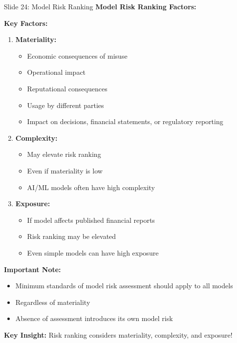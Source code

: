 \documentclass[8pt]{beamer}
\begin{document}
	\begin{frame}{Slide 24: Model Risk Ranking}
		\fontsize{6.5}{7.5}\selectfont
		\textbf{Model Risk Ranking Factors:}
		
		\vspace{0.1cm}
		\textbf{Key Factors:}
		\begin{enumerate}
			\item \textbf{Materiality:}
			\begin{itemize}
				\item Economic consequences of misuse
				\item Operational impact
				\item Reputational consequences
				\item Usage by different parties
				\item Impact on decisions, financial statements, or regulatory reporting
			\end{itemize}
			\item \textbf{Complexity:}
			\begin{itemize}
				\item May elevate risk ranking
				\item Even if materiality is low
				\item AI/ML models often have high complexity
			\end{itemize}
			\item \textbf{Exposure:}
			\begin{itemize}
				\item If model affects published financial reports
				\item Risk ranking may be elevated
				\item Even simple models can have high exposure
			\end{itemize}
		\end{enumerate}
		
		\vspace{0.1cm}
		\textbf{Important Note:}
		\begin{itemize}
			\item Minimum standards of model risk assessment should apply to all models
			\item Regardless of materiality
			\item Absence of assessment introduces its own model risk
		\end{itemize}
		
		\textcolor{myblue}{\textbf{Key Insight:}} Risk ranking considers \textcolor{myblue}{materiality, complexity, and exposure}!
	\end{frame}
	
\end{document}
